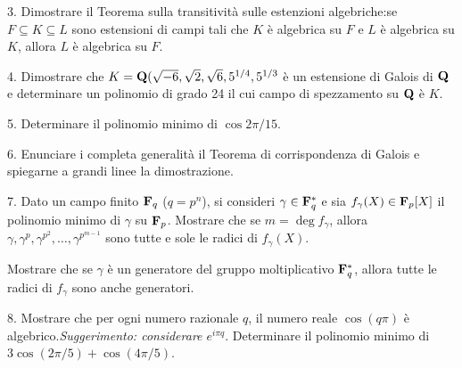 \item{3.} Dimostrare il Teorema sulla transitivit\`a sulle estenzioni algebriche:se $F\subseteq K\subseteq L$ sono estensioni 
di campi tali che $K$ \`e algebrica su $F$ e  $L$ \`e algebrica su $K$, allora $L$ \`e algebrica su $F$.
\vfill


\item{4.} Dimostrare che $K={\bf Q}(\sqrt{-6},\sqrt{2},\sqrt{6},5^{1/4}, 5^{1/3}$ \`e un estensione di Galois di ${\bf Q}$ e determinare un polinomio di grado 24 il cui campo di spezzamento su ${\bf Q}$ \`e $K$. \vv

\vfill\eject

\item{5.} Determinare il polinomio minimo di $\cos2\pi/15$.
\vfill

\item{6.} Enunciare i completa generalit\`a il Teorema di corrispondenza di Galois e spiegarne a grandi linee la dimostrazione.\vskip 6cm\bigskip\bigskip\bigskip\vv\vv

\vfil\eject

\item{7.} Dato un campo finito ${\bf F}_{q}$ ($q=p^n$), si consideri $\gamma\in{\bf F}_{q}^*$ e sia  $f_\gamma(X)\in{\bf F}_p[X]$ il 
polinomio minimo di $\gamma$ su ${\bf F}_p$.
 Mostrare che se  $m=\deg f_\gamma$, allora $\gamma, \gamma^p, \gamma^{p^2},\ldots, \gamma^{p^{m-1}}$ sono tutte e sole 
le radici di  $f_\gamma(X)$.\medskip

 Mostrare che se  $\gamma$ \`e un generatore del gruppo moltiplicativo ${\bf F}_{q}^*$, allora tutte le radici di $f_\gamma$ sono anche generatori.
\vfill

\item{8.} 
 Mostrare che per ogni numero razionale $q$, il numero reale $\cos(q\pi)$ \`e algebrico.\hfill{\it Suggerimento: considerare $e^{i\pi q}$}.\medskip
{} Determinare il polinomio minimo di $3\cos(2\pi/5)+\cos(4\pi/5)$.

\vfill \bye
